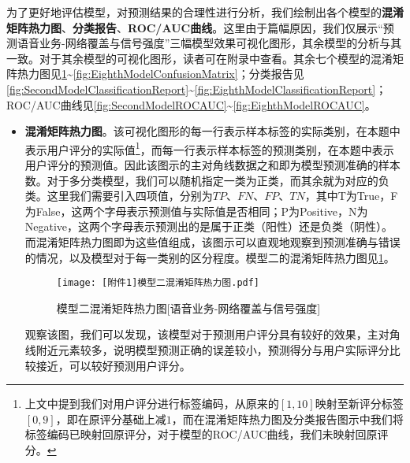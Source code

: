 \documentclass{MathorCupmodeling}
\begin{document}
	为了更好地评估模型，对预测结果的合理性进行分析，我们绘制出各个模型的\textbf{混淆矩阵热力图}、\textbf{分类报告}、\textbf{ROC/AUC曲线}。这里由于篇幅原因，我们仅展示“预测语音业务-网络覆盖与信号强度”三幅模型效果可视化图形，其余模型的分析与其一致。对于其余模型的可视化图形，读者可在附录中查看。其余七个模型的混淆矩阵热力图见\textcolor{blue}{\cref{fig:SecondModelConfusionMatrix}}\textasciitilde\textcolor{blue}{\cref{fig:EighthModelConfusionMatrix}}；分类报告见\textcolor{blue}{\cref{fig:SecondModelClassificationReport}}\textasciitilde\textcolor{blue}{\cref{fig:EighthModelClassificationReport}}；ROC/AUC曲线见\textcolor{blue}{\cref{fig:SecondModelROCAUC}}\textasciitilde\textcolor{blue}{\cref{fig:EighthModelROCAUC}}。
	\begin{itemize}
		\item \textbf{混淆矩阵热力图}。该可视化图形的每一行表示样本标签的实际类别，在本题中表示用户评分的实际值\textcolor{blue}{\footnote{上文中提到我们对用户评分进行标签编码，从原来的$\left[1,10\right]$映射至新评分标签$\left[0,9\right]$，即在原评分基础上减$1$，而在混淆矩阵热力图及分类报告图示中我们将标签编码已映射回原评分，对于模型的ROC/AUC曲线，我们未映射回原评分。}}，而每一行表示样本标签的预测类别，在本题中表示用户评分的预测值。因此该图示的主对角线数据之和即为模型预测准确的样本数。对于多分类模型，我们可以随机指定一类为正类，而其余就为对应的负类。这里我们需要引入四项值，分别为$TP$、$FN$、$FP$、$TN$，其中T为True，F为False，这两个字母表示预测值与实际值是否相同；P为Positive，N为Negative，这两个字母表示预测出的是属于正类（阳性）还是负类（阴性）。而混淆矩阵热力图即为这些值组成，该图示可以直观地观察到预测准确与错误的情况，以及模型对于每一类别的区分程度。模型二的混淆矩阵热力图见\textcolor{blue}{\cref{fig:SecondModelConfusionMatrix}}。
		\begin{figure}[H]
			\centerline{\texttt{[image: [附件1]模型二混淆矩阵热力图.pdf]}}
			\caption{模型二混淆矩阵热力图[语音业务-网络覆盖与信号强度]}\label{fig:SecondModelConfusionMatrix}
		\end{figure}

		观察该图，我们可以发现，该模型对于预测用户评分具有较好的效果，主对角线附近元素较多，说明模型预测正确的误差较小，预测得分与用户实际评分比较接近，可以较好预测用户评分。


\end{itemize}
\end{document}
